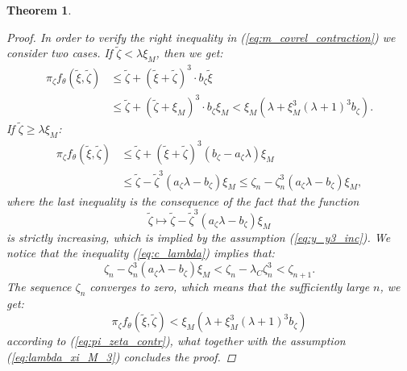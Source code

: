 \documentclass[1p]{article}
\newtheorem{theorem}{Theorem}
\begin{document}
\begin{theorem}
\begin{proof}
        In order to verify the right inequality in (\ref{eq:m_covrel_contraction}) we consider two cases. If $\tilde{\zeta} < \lambda \xi_M$, then we get:
        \begin{equation}
            \label{eq:pi_zeta_contr}
            \begin{split}
                \pi_\zeta f_\theta \left( \tilde{\xi},\tilde{\zeta} \right) &\leq
                \tilde{\zeta} + \left( \tilde{\xi}+\tilde{\zeta} \right)^3 \cdot b_\zeta \tilde{\xi}\\ &\leq
                \tilde{\zeta} + \left( \tilde{\zeta}+\xi_M \right)^3 \cdot b_\zeta \xi_M <
                \xi_M \left( \lambda + \xi_M^3 (\lambda + 1)^3 b_\zeta \right).
            \end{split}
        \end{equation}
        If $\tilde{\zeta} \geq \lambda \xi_M$:
        \begin{equation*}
            \begin{split}
                \pi_\zeta f_\theta \left( \tilde{\xi},\tilde{\zeta} \right) &\leq
                \tilde{\zeta} + \left( \tilde{\xi}+\tilde{\zeta} \right)^3 \left( b_\zeta - a_\zeta \lambda \right) \xi_M \\ &\leq
                \tilde{\zeta} - \tilde{\zeta}^3 \left( a_\zeta \lambda - b_\zeta \right)\xi_M \leq
                \zeta_n - \zeta_n^3 \left(a_\zeta \lambda - b_\zeta \right) \xi_M,
            \end{split}
        \end{equation*}
        where the last inequality is the consequence of the fact that the function
        \[
            \tilde{\zeta} \mapsto \tilde{\zeta} - \tilde{\zeta}^3 (a_\zeta \lambda - b_\zeta)\xi_M
        \]
        is strictly increasing, which is implied by the assumption (\ref{eq:y_y3_inc}). We notice that the inequality (\ref{eq:c_lambda}) implies that:
        \[
            \zeta_n - \zeta_n^3 (a_\zeta \lambda - b_\zeta )\xi_M < \zeta_n - \lambda_C \zeta_n^3 < \zeta_{n+1}.
        \]
        The sequence $\zeta_n$ converges to zero, which means that the sufficiently large $n$, we get:
        \[
            \pi_\zeta f_\theta \left( \tilde{\xi},\tilde{\zeta} \right) <
            \xi_M \left( \lambda + \xi_M^3 (\lambda + 1)^3 b_\zeta \right)
        \]
        according to (\ref{eq:pi_zeta_contr}), what together with the assumption (\ref{eq:lambda_xi_M_3}) concludes the proof.
    \end{proof}
\end{theorem}
\end{document}
